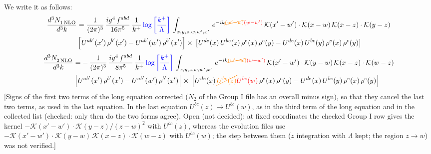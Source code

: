 \documentclass[9pt]{article}
\numberwithin{equation}{section}
\begin{document}
We write it as follows: 
\begin{align}
   \frac{d^{3}N_{1\,\rm NLO}^{\rm}}{d^{3}k}  & = \frac{1}{(2\pi)^{3}}\,\frac{ig^{4}\,f^{abd}}{16\pi^{5}}\,\frac{1}{k^{+}}\,{\color{blue}\log{\left[\frac{k^{+}}{\Lambda}\right]}}\,\int_{x,y,z,w,w',x'}\,e^{-ik{\color{orange}\cancel{(w^\prime-w)}}{\color{red}(w-w^\prime)}}\, \mathcal{K}(x'-w')\cdot \mathcal{K}(x-w)\, \mathcal{K}(x-z)\cdot \mathcal{K}(y-z) \notag \\ & \left[U^{ab'}(x')\,\rho^{b'}(x')-U^{ab'}(w')\, \rho^{b'}(x')\right]\times\, \left[U^{de}(x)\,U^{bc}(z)\, \rho^{e}(x)\,\rho^{c}(y)-U^{de}(x)\,U^{bc}(y)\,\rho^{e}(x)\,\rho^{c}(y)\right]
\end{align}
\begin{align}
   \frac{d^{3}N_{2\,\rm NLO}^{\rm}}{d^{3}k}  & = -\,\frac{1}{(2\pi)^{3}}\, \frac{ig^{4}\, f^{abd}}{8\pi^{5}}\, \frac{1}{k^{+}}\,{\color{blue}\log{\left[\frac{k^{+}}{\Lambda}\right]}}\,\int_{x,y,z,w,w',x'}\,e^{-ik{\color{orange}\cancel{(w^\prime-w)}}{\color{red}(w-w^\prime)}}\, \mathcal{K}(x'-w')\cdot \mathcal{K}(y-w)\,\mathcal{K}(x-z)\cdot \mathcal{K}(w-z) \notag \\ & \left[U^{ab'}(x')\,\rho^{b'}(x')-U^{ab'}(w')\, \rho^{b'}(x')\right]\times\,\left[U^{de}(x)\,{\color{orange}\cancel{U^{bc}(z)}}{\color{red}U^{bc}(w)}\, \rho^{e}(x)\,\rho^{c}(y)-U^{de}(x)\,U^{bc}(y)\,\rho^{e}(x)\,\rho^{c}(y)\right] 
\end{align} {\color{red}[Signs of the first two terms of the long equation corrected ($N_{2}$ of the Group I file has an overall minus sign), so that they cancel the last two terms, as used in the last equation. In the last equation $U^{bc}(z)\to U^{bc}(w)$, as in the third term of the long equation and in the collected list (checked: only then do the two forms agree). Open (not decided): at fixed coordinates the checked Group I row gives the kernel $-\mathcal{K}(x'-w')\cdot\mathcal{K}(y-z)/(z-w)^{2}$ with $U^{bc}(z)$, whereas the evolution files use $-\mathcal{K}(x'-w')\cdot\mathcal{K}(y-w)\,\mathcal{K}(x-z)\cdot\mathcal{K}(w-z)$ with $U^{bc}(w)$; the step between them ($z$ integration with $\Lambda$ kept; the region $z\to w$) was not verified.]}\par\noindent
\end{document}
